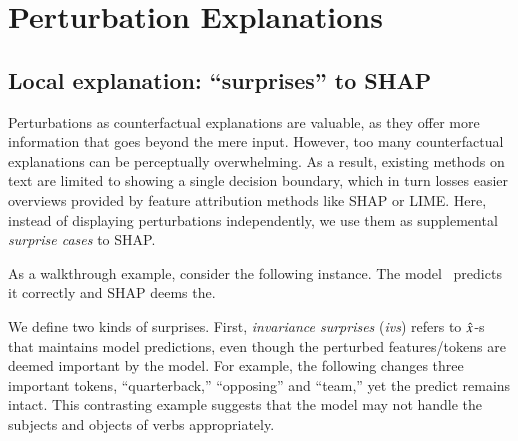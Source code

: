 \section{Perturbation Explanations}


\subsection{Local explanation: ``surprises'' to SHAP}

Perturbations as counterfactual explanations are valuable, as they offer more information that goes beyond the mere input.
However, too many counterfactual explanations can be perceptually overwhelming.
As a result, existing methods on text are limited to showing a single decision boundary, which in turn losses easier overviews provided by feature attribution methods like SHAP or LIME.
Here, instead of displaying perturbations independently, we use them as supplemental \emph{surprise cases} to SHAP.

As a walkthrough example, consider the following \dnli instance.
The model~\cite{} predicts it correctly and SHAP deems the.



We define two kinds of surprises.
First, \emph{invariance surprises} (\emph{ivs}) refers to $\hat{x}$-s that maintains model predictions, even though the perturbed features/tokens are deemed important by the model.
For example, the following changes three important tokens, ``quarterback,'' ``opposing'' and ``team,'' yet the predict remains intact. This contrasting example suggests that the model may not handle the subjects and objects of verbs appropriately.


